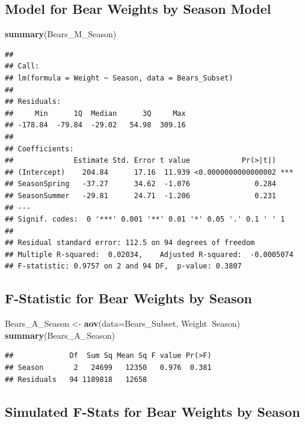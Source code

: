 \documentclass[]{book}
\newenvironment{Shaded}{\begin{snugshade}}{\end{snugshade}}
\newcommand{\KeywordTok}[1]{\textcolor[rgb]{0.13,0.29,0.53}{\textbf{#1}}}
\newcommand{\DataTypeTok}[1]{\textcolor[rgb]{0.13,0.29,0.53}{#1}}
\newcommand{\StringTok}[1]{\textcolor[rgb]{0.31,0.60,0.02}{#1}}
\newcommand{\OperatorTok}[1]{\textcolor[rgb]{0.81,0.36,0.00}{\textbf{#1}}}
\newcommand{\NormalTok}[1]{#1}
\begin{document}
\subsection{Model for Bear Weights by Season
Model}\label{model-for-bear-weights-by-season-model}

\begin{Shaded}
\begin{Highlighting}[]
\KeywordTok{summary}\NormalTok{(Bears_M_Season)}
\end{Highlighting}
\end{Shaded}

\begin{verbatim}
## 
## Call:
## lm(formula = Weight ~ Season, data = Bears_Subset)
## 
## Residuals:
##     Min      1Q  Median      3Q     Max 
## -178.84  -79.84  -29.02   54.98  309.16 
## 
## Coefficients:
##              Estimate Std. Error t value            Pr(>|t|)    
## (Intercept)    204.84      17.16  11.939 <0.0000000000000002 ***
## SeasonSpring   -37.27      34.62  -1.076               0.284    
## SeasonSummer   -29.81      24.71  -1.206               0.231    
## ---
## Signif. codes:  0 '***' 0.001 '**' 0.01 '*' 0.05 '.' 0.1 ' ' 1
## 
## Residual standard error: 112.5 on 94 degrees of freedom
## Multiple R-squared:  0.02034,    Adjusted R-squared:  -0.0005074 
## F-statistic: 0.9757 on 2 and 94 DF,  p-value: 0.3807
\end{verbatim}

\subsection{F-Statistic for Bear Weights by
Season}\label{f-statistic-for-bear-weights-by-season-1}

\begin{Shaded}
\begin{Highlighting}[]
\NormalTok{Bears_A_Season <-}\StringTok{ }\KeywordTok{aov}\NormalTok{(}\DataTypeTok{data=}\NormalTok{Bears_Subset, Weight}\OperatorTok{~}\NormalTok{Season)}
\KeywordTok{summary}\NormalTok{(Bears_A_Season)}
\end{Highlighting}
\end{Shaded}

\begin{verbatim}
##             Df  Sum Sq Mean Sq F value Pr(>F)
## Season       2   24699   12350   0.976  0.381
## Residuals   94 1189818   12658
\end{verbatim}

\subsection{Simulated F-Stats for Bear Weights by
Season}\label{simulated-f-stats-for-bear-weights-by-season}
\end{document}
